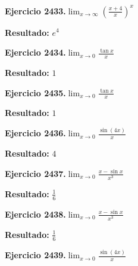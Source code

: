 \documentclass[10pt,a4paper]{article}
\begin{document}
\newpage
\begin{ejbox}
\textbf{Ejercicio 2433.}\quad $\lim_{x\to \infty} \left(\frac{x+4}{x}\right)^{x}$
\end{ejbox}

\begin{solbox}
\textbf{Resultado:} \(\displaystyle e^{4}\)
\end{solbox}

\begin{ejbox}
\textbf{Ejercicio 2434.}\quad $\lim_{x\to 0} \frac{\tan x}{x}$
\end{ejbox}

\begin{solbox}
\textbf{Resultado:} \(\displaystyle 1\)
\end{solbox}

\begin{ejbox}
\textbf{Ejercicio 2435.}\quad $\lim_{x\to 0} \frac{\tan x}{x}$
\end{ejbox}

\begin{solbox}
\textbf{Resultado:} \(\displaystyle 1\)
\end{solbox}

\newpage
\begin{ejbox}
\textbf{Ejercicio 2436.}\quad $\lim_{x\to 0} \frac{\sin(4x)}{x}$
\end{ejbox}

\begin{solbox}
\textbf{Resultado:} \(\displaystyle 4\)
\end{solbox}

\begin{ejbox}
\textbf{Ejercicio 2437.}\quad $\lim_{x\to 0} \frac{x-\sin x}{x^3}$
\end{ejbox}

\begin{solbox}
\textbf{Resultado:} \(\displaystyle \frac{1}{6}\)
\end{solbox}

\begin{ejbox}
\textbf{Ejercicio 2438.}\quad $\lim_{x\to 0} \frac{x-\sin x}{x^3}$
\end{ejbox}

\begin{solbox}
\textbf{Resultado:} \(\displaystyle \frac{1}{6}\)
\end{solbox}

\newpage
\begin{ejbox}
\textbf{Ejercicio 2439.}\quad $\lim_{x\to 0} \frac{\sin(4x)}{x}$
\end{ejbox}
\end{document}
